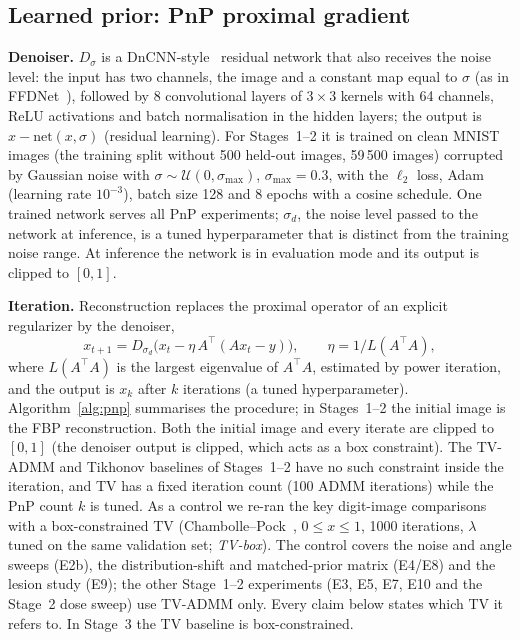 \subsection{Learned prior: PnP proximal gradient}\label{sec:pnp}
\textbf{Denoiser.} $D_\sigma$ is a DnCNN-style~\citep{zhang2017dncnn} residual network that also receives the noise level: the input has two channels, the image and a constant map equal to $\sigma$ (as in FFDNet~\citep{zhang2018ffdnet}), followed by 8 convolutional layers of $3\times3$ kernels with 64 channels, ReLU activations and batch normalisation in the hidden layers; the output is $x-\mathrm{net}(x,\sigma)$ (residual learning).
For Stages~1--2 it is trained on clean MNIST images (the training split without 500 held-out images, 59\,500 images) corrupted by Gaussian noise with $\sigma\sim\mathcal{U}(0,\sigma_{\max})$, $\sigma_{\max}=0.3$, with the $\ell_2$ loss, Adam~\citep{kingma2015adam} (learning rate $10^{-3}$), batch size 128 and 8 epochs with a cosine schedule.
One trained network serves all PnP experiments; $\sigma_d$, the noise level passed to the network at inference, is a tuned hyperparameter that is distinct from the training noise range. At inference the network is in evaluation mode and its output is clipped to $[0,1]$.

\textbf{Iteration.} Reconstruction replaces the proximal operator of an explicit regularizer by the denoiser,
\begin{equation}
x_{t+1} = D_{\sigma_d}\big(x_t - \eta \, A^\top(Ax_t - y)\big), \qquad
\eta = 1/L(A^\top A),
\end{equation}
where $L(A^\top A)$ is the largest eigenvalue of $A^\top A$, estimated by power iteration, and the output is $x_k$ after $k$ iterations (a tuned hyperparameter). Algorithm~\ref{alg:pnp} summarises the procedure; in Stages~1--2 the initial image is the FBP reconstruction.
Both the initial image and every iterate are clipped to $[0,1]$ (the denoiser output is clipped, which acts as a box constraint). The TV-ADMM and Tikhonov baselines of Stages~1--2 have no such constraint inside the iteration, and TV has a fixed iteration count (100 ADMM iterations) while the PnP count $k$ is tuned. As a control we re-ran the key digit-image comparisons with a box-constrained TV (Chambolle--Pock~\citep{chambolle2011}, $0\le x\le 1$, 1000 iterations, $\lambda$ tuned on the same validation set; \emph{TV-box}). The control covers the noise and angle sweeps (E2b), the distribution-shift and matched-prior matrix (E4/E8) and the lesion study (E9); the other Stage~1--2 experiments (E3, E5, E7, E10 and the Stage~2 dose sweep) use TV-ADMM only. Every claim below states which TV it refers to. In Stage~3 the TV baseline is box-constrained.

